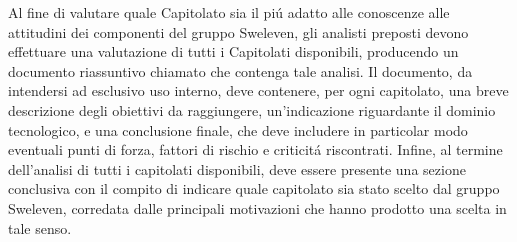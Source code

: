 Al fine di valutare quale Capitolato sia il pi\'u adatto alle conoscenze alle attitudini dei componenti del gruppo Sweleven, gli analisti preposti devono effettuare una valutazione di tutti i Capitolati disponibili, producendo un documento riassuntivo chiamato \SdFv{} che contenga tale analisi. Il documento, da intendersi ad esclusivo uso interno, deve contenere, per ogni capitolato, una breve descrizione degli obiettivi da raggiungere, un'indicazione riguardante il dominio tecnologico, e una conclusione finale, che deve includere in particolar modo eventuali punti di forza, fattori di rischio e criticit\'a riscontrati. Infine, al termine dell'analisi di tutti i capitolati disponibili, deve essere presente una sezione conclusiva con il compito di indicare quale capitolato sia stato scelto dal gruppo Sweleven, corredata dalle principali motivazioni che hanno prodotto una scelta in tale senso.